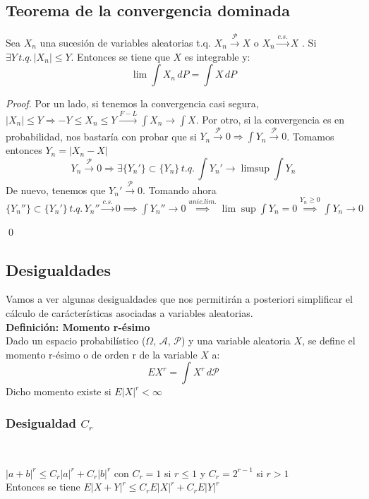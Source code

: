 \subsection{Teorema de la convergencia dominada}
\begin{theorem}
Sea $X_n$ una sucesión de variables aleatorias t.q.  $X_n \stackrel{\mathcal{P}}{\rightarrow} X$ o $X_n \stackrel{c.s.}{\rightarrow} X$  . Si $\exists Y \, t.q. \, |X_n |\leq Y$. Entonces se tiene que $X$ es integrable y:
$$\lim\int X_n\, dP=\int X\, dP$$
\end{theorem}

\begin{proof}
Por un lado, si tenemos la convergencia casi segura, $|X_n| \leq Y \Rightarrow -Y \leq X_n \leq Y \stackrel{F-L}{\rightarrow} \displaystyle \int X_n \to \int X$.
Por otro, si la convergencia es en probabilidad, nos bastaría con probar que si $Y_n \stackrel{\mathcal{P}}{\rightarrow} 0 \Rightarrow \displaystyle \int Y_n \stackrel{\mathcal{P}}{\rightarrow} 0$. Tomamos entonces $Y_n = |X_n - X|$
$$ Y_n \stackrel{\mathcal{P}}{\rightarrow} 0 \Rightarrow \exists \{Y_n'\} \subset \{Y_n\} \, t.q. \, \int Y_n' \rightarrow \limsup \int Y_n$$
De nuevo, tenemos que $Y_n' \stackrel{\mathcal{P}}{\rightarrow} 0$. Tomando ahora $\{Y_n''\} \subset \{Y_n'\} \, t.q. \, Y_n'' \stackrel{c.s.}{\rightarrow} 0 
\implies 
\displaystyle \int Y_n'' \rightarrow 0 \stackrel{unic.lim.}{\implies} \lim \sup \int Y_n = 0 \stackrel{Y_n \geq 0}{\implies} \int Y_n \rightarrow 0$

\qed
\end{proof}

\subsection{Desigualdades}

Vamos a ver algunas desigualdades que nos permitirán a posteriori simplificar el cálculo de carácterísticas asociadas a variables aleatorias.\\

\textbf{Definición: Momento r-ésimo}\\

Dado un espacio probabilístico ($\Omega$, $\mathcal{A}$, $\mathcal{P}$) y una variable aleatoria $X$, se define el momento r-ésimo o de orden r de la variable $X$ a:
$$ EX^r = \int X^r \, d \mathcal{P} $$
Dicho momento existe si $E|X|^r < \infty$

\subsubsection{Desigualdad $C_r$}
\begin{lemma}

\
  
$|a+b|^r\leq C_r |a|^r + C_r |b|^r$ con $C_r=1$ si $r\leq1$ y $C_r=2^{r-1}$ si $r>1$\\

Entonces se tiene $E|X+Y|^r \leq C_r E|X|^r + C_r E|Y|^r$
\end{lemma}

